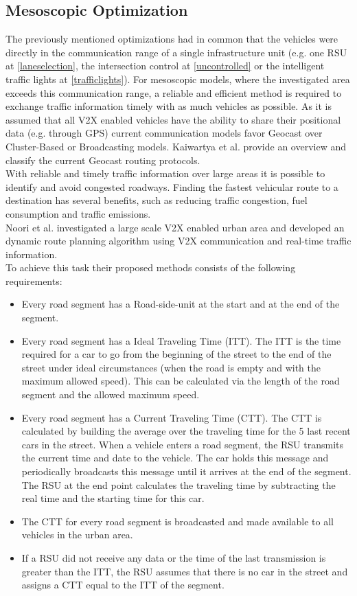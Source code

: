 \documentclass{sig-alternate}
\begin{document}
\subsection{Mesoscopic Optimization}
\label{mesoscopic}
The previously mentioned optimizations had in common that the vehicles were directly in the communication range of a single infrastructure unit (e.g. one RSU at \ref{laneselection}, the intersection control at \ref{uncontrolled} or the intelligent traffic lights at \ref{trafficlights}). For mesoscopic models, where the investigated area exceeds this communication range, a reliable and efficient method is required to exchange traffic information timely with as much vehicles as possible. As it is assumed that all V2X enabled vehicles have the ability to share their positional data (e.g. through GPS) current communication models favor Geocast over Cluster-Based or Broadcasting models. Kaiwartya et al.\cite{6776965} provide an overview and classify the current Geocast routing protocols. \\  
With reliable and timely traffic information over large areas it is possible to identify and avoid congested roadways. Finding the fastest vehicular route to a destination has several benefits, such as reducing traffic congestion, fuel consumption and traffic emissions.\\
Noori et al.\cite{6799873} investigated a large scale V2X enabled urban area and developed an dynamic route planning algorithm using V2X communication and real-time traffic information. \\
To achieve this task their proposed methods consists of the following requirements:
\begin{itemize}
\item Every road segment has a Road-side-unit at the start and at the end of the segment. 
\item Every road segment has a Ideal Traveling Time (ITT). The ITT is the time required for a car to go from the beginning of the street to the end of the street under ideal circumstances (when the road is empty and with the maximum allowed speed). This can be calculated via the length of the road segment and the allowed maximum speed. 
\item Every road segment has a Current Traveling Time (CTT). The CTT is calculated by building the average over the traveling time for the 5 last recent cars in the street. When a vehicle enters a road segment, the RSU transmits the current time and date to the vehicle. The car holds this message and periodically broadcasts this message until it arrives at the end of the segment. The RSU at the end point calculates the traveling time by subtracting the real time and the starting time for this car. 
\item The CTT for every road segment is broadcasted and made available to all vehicles in the urban area. 
\item If a RSU did not receive any data or the time of the last transmission is greater than the ITT, the RSU assumes that there is no car in the street and assigns a CTT equal to the ITT of the segment.
\end{itemize}
\end{document}
